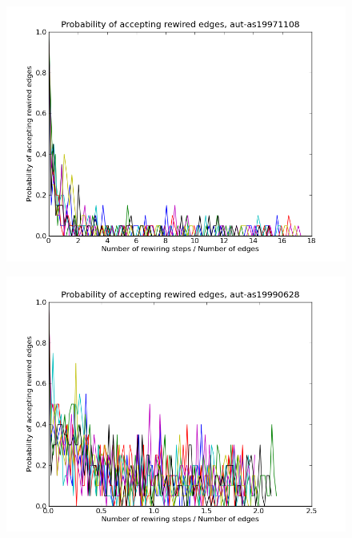 \documentclass[12pt]{article}
\begin{document}
\begin{figure}[p]
\includegraphics[scale=0.75]{Paccept-aut-as19971108.png}\\
\end{figure}

\begin{figure}[p]
\includegraphics[scale=0.75]{Paccept-aut-as19990628.png}\\
\end{figure}
\end{document}
